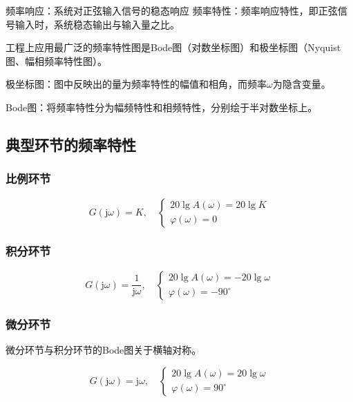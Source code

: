 \documentclass[cn, blue, normal, 12pt]{elegantnote}
\begin{document}
频率响应：系统对正弦输入信号的稳态响应
频率特性：频率响应特性，即正弦信号输入时，系统稳态输出与输入量之比。

工程上应用最广泛的频率特性图是Bode图（对数坐标图）和极坐标图（Nyquist图、幅相频率特性图）。

极坐标图：图中反映出的量为频率特性的幅值和相角，而频率$\omega$为隐含变量。

Bode图：将频率特性分为幅频特性和相频特性，分别绘于半对数坐标上。

\subsection{典型环节的频率特性}

\subsubsection{比例环节}

\begin{equation}
    G(\mathrm{j}\omega)=K, \quad 
    \left\{
        \begin{array}{l}
            20\lg{A(\omega)}=20\lg{K} \\
            \varphi(\omega)=0
        \end{array}
    \right.
\end{equation}

\subsubsection{积分环节}

\begin{equation}
    G(\mathrm{j}\omega)=\frac{1}{\mathrm{j}\omega}, \quad 
    \left\{
        \begin{array}{l}
            20\lg{A(\omega)}=-20\lg{\omega} \\
            \varphi(\omega)=-90^{\circ}
        \end{array}
    \right.
\end{equation}

\subsubsection{微分环节}

微分环节与积分环节的Bode图关于横轴对称。

\begin{equation}
    G(\mathrm{j}\omega)=\mathrm{j}\omega, \quad 
    \left\{
        \begin{array}{l}
            20\lg{A(\omega)}=20\lg{\omega} \\
            \varphi(\omega)=90^{\circ}
        \end{array}
    \right.
\end{equation}
\end{document}

